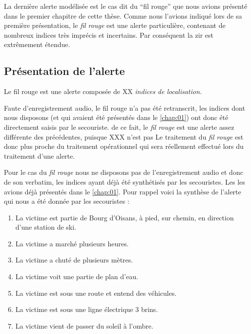 
La dernière alerte modélisée est le cas dit du \enquote{fil rouge} que
nous avions présenté dans le premier chapitre de cette thèse. Comme
nous l'avions indiqué lors de sa première présentation, le \emph{fil
  rouge} est une alerte particulière, contenant de nombreux indices
très imprécis et incertains. Par conséquent la \ac{zir} est
extrêmement étendue.


\subsection{Présentation de l'alerte}
\label{subsec:9-4-1}

Le fil rouge est une alerte composée de XX \emph{indices de
  localisation.}


Faute d'enregistrement audio, le fil rouge n'a pas été retranscrit,
les indices dont nous disposons (et qui avaient été présentés dans le
\autoref{chap:01}) ont donc été directement saisis par le secouriste.
%
de ce fait, le \emph{fil rouge} est une alerte assez différente des
précédentes, puisque XXX n'est pas
%
Le traitement du \emph{fil rouge} est donc plus proche du traitement
opérationnel qui sera réellement effectué lors du traitement d'une
alerte.


Pour le cas du \emph{fil rouge} nous ne disposons pas de
l'enregistrement audio et donc de son verbatim, les indices ayant déjà 
été synthétisés par les secouristes. Les les avions déjà présentés
dans le \autoref{chap:01}.
%
Pour rappel voici la synthèse de l'alerte qui nous a été donnée par
les secouristes :
%
\begin{enumerate}
\item La victime est partie de Bourg d'Oisans, à pied, sur chemin, en
  direction d'une station de ski.
\item La victime a marché plusieurs heures.
\item La victime a chuté de plusieurs mètres.
\item La victime voit une partie de plan d'eau.
\item La victime est sous une route et entend des véhicules.
\item La victime est sous une ligne électrique 3 brins.
\item La victime vient de passer du soleil à l'ombre.
\end{enumerate}


